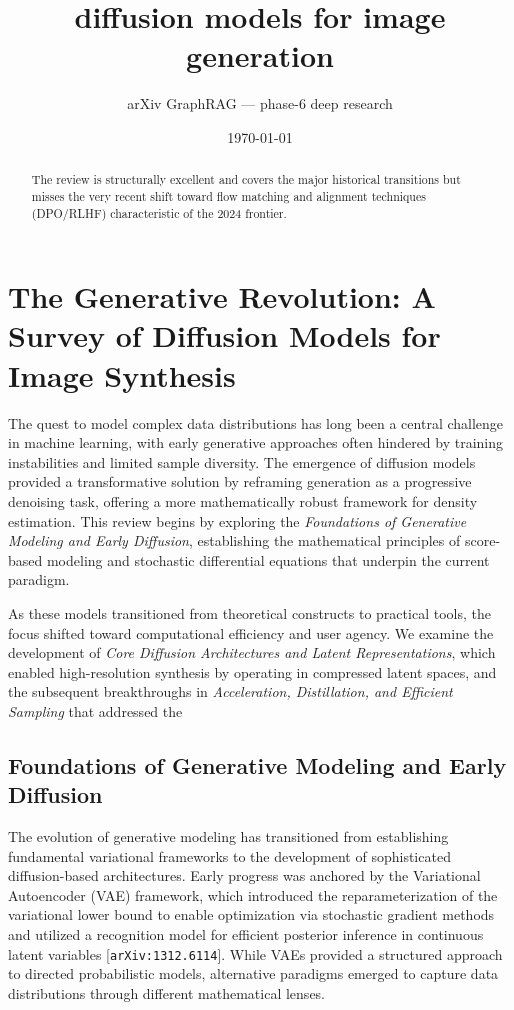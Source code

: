 \documentclass[11pt]{article}
\title{diffusion models for image generation}
\author{arXiv GraphRAG --- phase-6 deep research}
\date{\today}
\begin{document}
\maketitle

\begin{abstract}
The review is structurally excellent and covers the major historical transitions but misses the very recent shift toward flow matching and alignment techniques (DPO/RLHF) characteristic of the 2024 frontier.
\end{abstract}

\section{The Generative Revolution: A Survey of Diffusion Models for Image Synthesis}

The quest to model complex data distributions has long been a central challenge in machine learning, with early generative approaches often hindered by training instabilities and limited sample diversity. The emergence of diffusion models provided a transformative solution by reframing generation as a progressive denoising task, offering a more mathematically robust framework for density estimation. This review begins by exploring the \textit{Foundations of Generative Modeling and Early Diffusion}, establishing the mathematical principles of score-based modeling and stochastic differential equations that underpin the current paradigm.

As these models transitioned from theoretical constructs to practical tools, the focus shifted toward computational efficiency and user agency. We examine the development of \textit{Core Diffusion Architectures and Latent Representations}, which enabled high-resolution synthesis by operating in compressed latent spaces, and the subsequent breakthroughs in \textit{Acceleration, Distillation, and Efficient Sampling} that addressed the

\subsection{Foundations of Generative Modeling and Early Diffusion}

The evolution of generative modeling has transitioned from establishing fundamental variational frameworks to the development of sophisticated diffusion-based architectures. Early progress was anchored by the Variational Autoencoder (VAE) framework, which introduced the reparameterization of the variational lower bound to enable optimization via stochastic gradient methods and utilized a recognition model for efficient posterior inference in continuous latent variables [\texttt{arXiv:1312.6114}]. While VAEs provided a structured approach to directed probabilistic models, alternative paradigms emerged to capture data distributions through different mathematical lenses.
\end{document}
